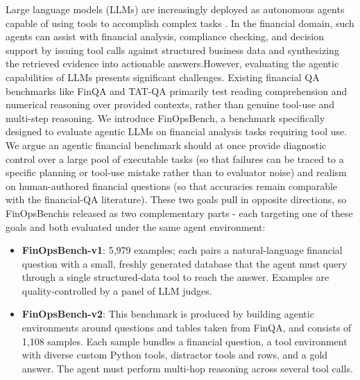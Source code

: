 \documentclass[11pt]{article}
\newcommand{\datasetname}{FinOpsBench}\xspace
\newcommand{\synthsubset}{FinOpsBench-v1}\xspace
\newcommand{\groundedfinqa}{FinOpsBench-v2}\xspace
\begin{document}
Large language models (LLMs) are increasingly deployed as autonomous agents capable of using tools to accomplish complex tasks \citep{Schick2023ToolformerLM, qin2023toolllm}. In the financial domain, such agents can assist with financial analysis, compliance checking, and decision support by issuing tool calls against structured business data and synthesizing the retrieved evidence into actionable answers.However, evaluating the agentic capabilities of LLMs presents significant challenges. Existing financial QA benchmarks like FinQA \citep{chen2021finqa} and TAT-QA \citep{zhu-etal-2021-tat} primarily test reading comprehension and numerical reasoning over provided contexts, rather than genuine tool-use and multi-step reasoning. 
We introduce \datasetname, a benchmark specifically designed to evaluate agentic LLMs on financial analysis tasks requiring tool use. We argue an agentic financial benchmark should at once provide diagnostic control over a large pool of executable tasks (so that failures can be traced to a specific planning or tool-use mistake rather than to evaluator noise) and realism on human-authored financial questions (so that accuracies remain comparable with the financial-QA literature). These two goals pull in opposite directions, so \datasetname is released as two complementary parts - each targeting one of these goals and both evaluated under the same agent environment:

\begin{itemize}
    \item \textbf{\synthsubset}: 5,979 examples; each pairs a natural-language financial question with a small, freshly generated database that the agent must query through a single structured-data tool to reach the answer. Examples are quality-controlled by a panel of LLM judges.
    
    \item \textbf{\groundedfinqa}: This benchmark is produced by building agentic environments around questions and tables taken from FinQA, and consists of 1,108 samples. Each sample bundles a financial question, a tool environment with diverse custom Python tools, distractor tools and rows, and a gold answer. The agent must perform multi-hop reasoning across several tool calls.
\end{itemize}
\end{document}
